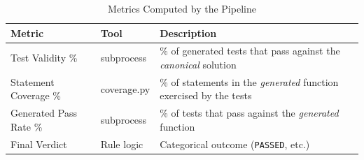 \documentclass[12pt, a4paper]{article}
\begin{document}
\begin{table}[H]
\centering
\caption{Metrics Computed by the Pipeline}
\begin{tabularx}{0.92\linewidth}{llX}
\toprule
\rowcolor{AccentA!10}
\textbf{Metric} & \textbf{Tool} & \textbf{Description} \\
\midrule
Test Validity \%         & subprocess & \% of generated tests that pass against the
                                        \emph{canonical} solution \\
Statement Coverage \%    & coverage.py & \% of statements in the \emph{generated}
                                         function exercised by the tests \\
Generated Pass Rate \%   & subprocess & \% of tests that pass against the
                                        \emph{generated} function \\
Final Verdict            & Rule logic & Categorical outcome
                                        (\texttt{PASSED}, etc.) \\
\bottomrule
\end{tabularx}
\label{tab:metrics}
\end{table}



\end{document}
